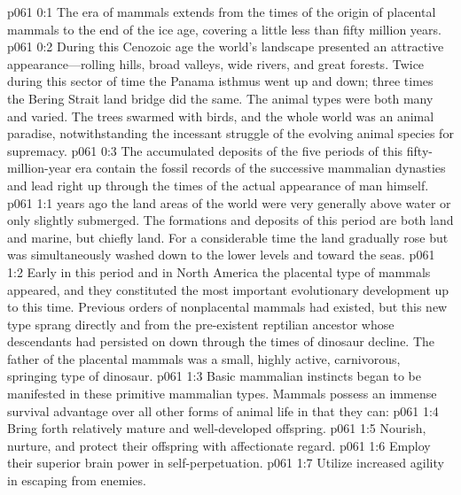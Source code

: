 \author{Life Carrier}
\vs p061 0:1 The era of mammals extends from the times of the origin of placental mammals to the end of the ice age, covering a little less than fifty million years.
\vs p061 0:2 During this Cenozoic age the world’s landscape presented an attractive appearance---rolling hills, broad valleys, wide rivers, and great forests. Twice during this sector of time the Panama isthmus went up and down; three times the Bering Strait land bridge did the same. The animal types were both many and varied. The trees swarmed with birds, and the whole world was an animal paradise, notwithstanding the incessant struggle of the evolving animal species for supremacy.
\vs p061 0:3 The accumulated deposits of the five periods of this fifty\hyp{}million\hyp{}year era contain the fossil records of the successive mammalian dynasties and lead right up through the times of the actual appearance of man himself.
\vs p061 1:1  years ago the land areas of the world were very generally above water or only slightly submerged. The formations and deposits of this period are both land and marine, but chiefly land. For a considerable time the land gradually rose but was simultaneously washed down to the lower levels and toward the seas.
\vs p061 1:2 Early in this period and in North America the placental type of mammals  appeared, and they constituted the most important evolutionary development up to this time. Previous orders of nonplacental mammals had existed, but this new type sprang directly and  from the pre\hyp{}existent reptilian ancestor whose descendants had persisted on down through the times of dinosaur decline. The father of the placental mammals was a small, highly active, carnivorous, springing type of dinosaur.
\vs p061 1:3 Basic mammalian instincts began to be manifested in these primitive mammalian types. Mammals possess an immense survival advantage over all other forms of animal life in that they can:
\pc \vs p061 1:4 \bibnobreakspace Bring forth relatively mature and well\hyp{}developed offspring.
\vs p061 1:5 \bibnobreakspace Nourish, nurture, and protect their offspring with affectionate regard.
\vs p061 1:6 \bibnobreakspace Employ their superior brain power in self\hyp{}perpetuation.
\vs p061 1:7 \bibnobreakspace Utilize increased agility in escaping from enemies.
